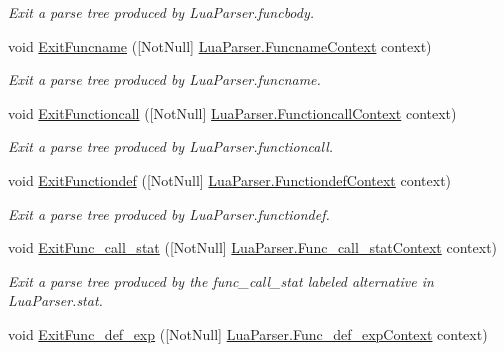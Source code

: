 \begin{DoxyCompactItemize}
\begin{DoxyCompactList}\small\item\em Exit a parse tree produced by Lua\+Parser.\+funcbody. \end{DoxyCompactList}\item 
void \mbox{\hyperlink{classzlua_1_1_compiler_adc2ed4db7299eb84e5a16cdbcda257d4}{Exit\+Funcname}} (\mbox{[}Not\+Null\mbox{]} \mbox{\hyperlink{classzlua_1_1_lua_parser_1_1_funcname_context}{Lua\+Parser.\+Funcname\+Context}} context)
\begin{DoxyCompactList}\small\item\em Exit a parse tree produced by Lua\+Parser.\+funcname. \end{DoxyCompactList}\item 
void \mbox{\hyperlink{classzlua_1_1_compiler_add5efa354ab9c4c04eb03d835b697acc}{Exit\+Functioncall}} (\mbox{[}Not\+Null\mbox{]} \mbox{\hyperlink{classzlua_1_1_lua_parser_1_1_functioncall_context}{Lua\+Parser.\+Functioncall\+Context}} context)
\begin{DoxyCompactList}\small\item\em Exit a parse tree produced by Lua\+Parser.\+functioncall. \end{DoxyCompactList}\item 
void \mbox{\hyperlink{classzlua_1_1_compiler_ac116526982cb40d063ff68949ab001e0}{Exit\+Functiondef}} (\mbox{[}Not\+Null\mbox{]} \mbox{\hyperlink{classzlua_1_1_lua_parser_1_1_functiondef_context}{Lua\+Parser.\+Functiondef\+Context}} context)
\begin{DoxyCompactList}\small\item\em Exit a parse tree produced by Lua\+Parser.\+functiondef. \end{DoxyCompactList}\item 
void \mbox{\hyperlink{classzlua_1_1_compiler_aecbd4798190717227c32cbd132d996dd}{Exit\+Func\+\_\+call\+\_\+stat}} (\mbox{[}Not\+Null\mbox{]} \mbox{\hyperlink{classzlua_1_1_lua_parser_1_1_func__call__stat_context}{Lua\+Parser.\+Func\+\_\+call\+\_\+stat\+Context}} context)
\begin{DoxyCompactList}\small\item\em Exit a parse tree produced by the {\ttfamily func\+\_\+call\+\_\+stat} labeled alternative in Lua\+Parser.\+stat. \end{DoxyCompactList}\item 
void \mbox{\hyperlink{classzlua_1_1_compiler_a52eac177380013cc2c8751c4bee9d1dc}{Exit\+Func\+\_\+def\+\_\+exp}} (\mbox{[}Not\+Null\mbox{]} \mbox{\hyperlink{classzlua_1_1_lua_parser_1_1_func__def__exp_context}{Lua\+Parser.\+Func\+\_\+def\+\_\+exp\+Context}} context)

\end{DoxyCompactItemize}
